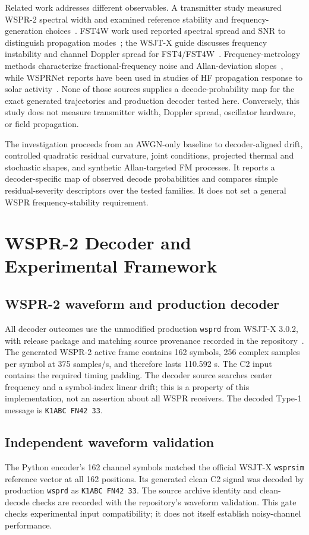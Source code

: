 \documentclass[conference]{IEEEtran}
\begin{document}
Related work addresses different observables. A transmitter study measured WSPR-2 spectral width and examined reference stability and frequency-generation choices~\cite{johnson2026}. FST4W work used reported spectral spread and SNR to distinguish propagation modes~\cite{griffiths2023}; the WSJT-X guide discusses frequency instability and channel Doppler spread for FST4/FST4W~\cite{wsjtxguide}. Frequency-metrology methods characterize fractional-frequency noise and Allan-deviation slopes~\cite{riley2008}, while WSPRNet reports have been used in studies of HF propagation response to solar activity~\cite{frissell2019}. None of those sources supplies a decode-probability map for the exact generated trajectories and production decoder tested here. Conversely, this study does not measure transmitter width, Doppler spread, oscillator hardware, or field propagation.

The investigation proceeds from an AWGN-only baseline to decoder-aligned drift, controlled quadratic residual curvature, joint conditions, projected thermal and stochastic shapes, and synthetic Allan-targeted FM processes. It reports a decoder-specific map of observed decode probabilities and compares simple residual-severity descriptors over the tested families. It does not set a general WSPR frequency-stability requirement.

\section{WSPR-2 Decoder and Experimental Framework}
\subsection{WSPR-2 waveform and production decoder}
All decoder outcomes use the unmodified production \texttt{wsprd} from WSJT-X 3.0.2, with release package and matching source provenance recorded in the repository~\cite{wsjtx302}. The generated WSPR-2 active frame contains 162 symbols, 256 complex samples per symbol at 375 samples/s, and therefore lasts 110.592 s. The C2 input contains the required timing padding. The decoder source searches center frequency and a symbol-index linear drift; this is a property of this implementation, not an assertion about all WSPR receivers. The decoded Type-1 message is \texttt{K1ABC FN42 33}.

\subsection{Independent waveform validation}
The Python encoder's 162 channel symbols matched the official WSJT-X \texttt{wsprsim} reference vector at all 162 positions. Its generated clean C2 signal was decoded by production \texttt{wsprd} as \texttt{K1ABC FN42 33}. The source archive identity and clean-decode checks are recorded with the repository's waveform validation. This gate checks experimental input compatibility; it does not itself establish noisy-channel performance.
\end{document}
